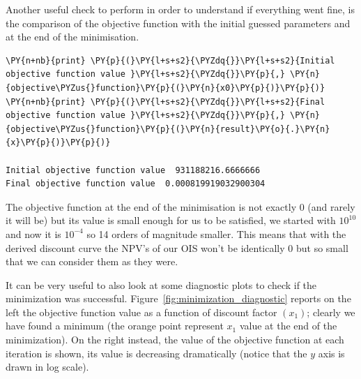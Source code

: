 Another useful check to perform in order to understand if everything went fine, is the comparison of the objective function with the initial guessed parameters and at the end of the minimisation.

\begin{tcolorbox}[breakable, size=fbox, boxrule=1pt, pad at break*=1mm,colback=cellbackground, colframe=cellborder]
\begin{Verbatim}[commandchars=\\\{\}]
\PY{n+nb}{print} \PY{p}{(}\PY{l+s+s2}{\PYZdq{}}\PY{l+s+s2}{Initial objective function value }\PY{l+s+s2}{\PYZdq{}}\PY{p}{,} \PY{n}{objective\PYZus{}function}\PY{p}{(}\PY{n}{x0}\PY{p}{)}\PY{p}{)}
\PY{n+nb}{print} \PY{p}{(}\PY{l+s+s2}{\PYZdq{}}\PY{l+s+s2}{Final objective function value }\PY{l+s+s2}{\PYZdq{}}\PY{p}{,} \PY{n}{objective\PYZus{}function}\PY{p}{(}\PY{n}{result}\PY{o}{.}\PY{n}{x}\PY{p}{)}\PY{p}{)}

Initial objective function value  931188216.6666666
Final objective function value  0.000819919032900304
    \end{Verbatim}
\end{tcolorbox}
The objective function at the end of the minimisation is not exactly 0 (and rarely it will be) but its value is small enough for us to be satisfied, we started with $10^{10}$ and now it is $10^{-4}$ so 14 orders of magnitude smaller. This means that with the derived discount curve the NPV's of our OIS won't be identically 0 but so small that we can consider them as they were.

It can be very useful to also look at some diagnostic plots to check if the minimization was successful. Figure~\ref{fig:minimization_diagnostic} reports on the left the objective function value as a function of discount factor $(x_1)$; clearly we have found a minimum (the orange point represent $x_1$ value at the end of the minimization). On the right instead, the value of the objective function at each iteration is shown, its value is decreasing dramatically (notice that the $y$ axis is drawn in log scale).

